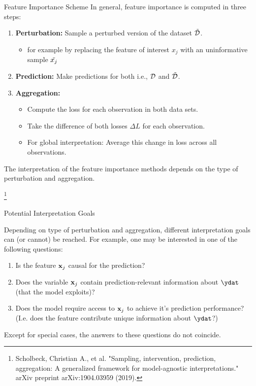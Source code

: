 \documentclass[11pt,compress,t,notes=noshow, xcolor=table]{beamer}
\begin{document}
\begin{vbframe}{Feature Importance Scheme}
In general, feature importance is computed in three steps:
\lz
\begin{enumerate}
  \item \textbf{Perturbation:} Sample a perturbed version of the dataset $\pert{\D}{}{}$.
  \begin{itemize}
    \item for example by replacing the feature of interest $x_j$ with an uninformative sample $\pert{x_j}{}{}$
    \end{itemize}
  \item \textbf{Prediction:} Make predictions for both i.e., $\D$ and $\pert{\D}{}{}$.
  \item \textbf{Aggregation:} 
    \begin{itemize}
      \item Compute the loss for each observation in both data sets.
      \item Take the difference of both losses $\Delta L$ for each observation.
      \item For global interpretation: Average this change in loss across all observations.
    \end{itemize}
\end{enumerate}
\lz
The interpretation of the feature importance methods depends on the type of perturbation and aggregation.

\footnote[frame]{Scholbeck, Christian A., et al. "Sampling, intervention, prediction, aggregation: A generalized framework for model-agnostic interpretations." arXiv preprint arXiv:1904.03959 (2019).}
\end{vbframe}


\begin{vbframe}{Potential Interpretation Goals}

Depending on type of perturbation and aggregation, different interpretation goals can (or cannot) be reached. For example, one may be interested in one of the following questions:
\lz
\begin{enumerate}
    \item Is the feature $\xj$ causal for the prediction?
    \item Does the variable $\xj$ contain prediction-relevant information about $\ydat$ (that the model exploits)?
    \item Does the model require access to $\xj$ to achieve it's prediction performance? (I.e. does the feature contribute unique information about $\ydat$?)
\end{enumerate}
\lz
Except for special cases, the answers to these questions do not coincide.
\end{vbframe}
\end{document}
